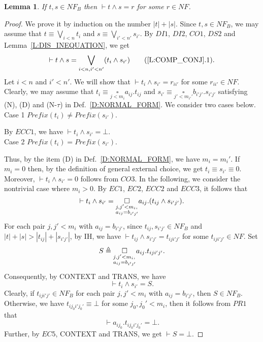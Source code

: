 \documentclass{elsarticle}
\theoremstyle{plain}
\newtheorem{lemma}[theorem]{Lemma}
\theoremstyle{definition}
\begin{document}
\begin{lemma}\label{L:COMP_CONJ}
  If $t,s\in NF_B$ then $\vdash t \wedge s = r$ for some $r \in NF$.
\end{lemma}
\begin{proof}
We prove it by induction on the number $|t|+|s|$.
  Since $t,s \in NF_B$, we may assume that $t \equiv \underset{i< n}{\bigvee}t_{i}$ and $s \equiv \underset{i'< n'}{\bigvee}s_{i'}$.
   By $DI1$, $DI2$, $CO1$, $DS2$ and Lemma~\ref{L:DIS_INEQUATION}, we get
   \[ \vdash t \wedge s
    = \bigvee_{i< n,i'< n'}(t_{i}\wedge s_{i'}) \tag{\ref{L:COMP_CONJ}.1}.\]
    Let $i< n$ and $i'< n'$. We will show that $\vdash t_{i} \wedge s_{i'}=r_{ii'}$ for some $r_{ii'} \in NF$. Clearly, we may assume that $t_{i}\equiv \underset{j< m_{i}}{\square}a_{ij}.t_{ij}$ and $s_{i'}\equiv \underset{j'< m_{i'}'}{\square}b_{i'j'}.s_{i'j'}$ satisfying (N), (D) and (N-$\tau$) in Def.~\ref{D:NORMAL_FORM}. We consider two cases below.\\


    \noindent Case 1 $Prefix(t_{i})\neq Prefix(s_{i'})$.

          By  $ECC1$, we have $\vdash t_{i} \wedge s_{i'}  = \bot $.\\

    \noindent Case 2  $Prefix(t_{i})= Prefix(s_{i'})$.

        Thus, by the item (D) in Def.~\ref{D:NORMAL_FORM}, we have $m_i = m_i'$.
        If $m_i=0$ then, by the definition of general external choice, we get $t_i\equiv s_{i'} \equiv 0$.
        Moreover, $\vdash t_i \wedge s_{i'}=0$ follows from $CO3$.
        In the following, we consider the nontrivial case where $m_i>0$.
        By $EC1$, $EC2$, $ECC2$ and $ECC3$, it follows that
        \[\vdash t_{i} \wedge s_{i'}  = \underset{\begin{subarray}
                   \; j,j'<m_i,\\
                   a_{ij}= b_{i'j'}
                \end{subarray}}\square a_{ij}.(t_{ij} \wedge s_{i'j'}). \]
         For each pair $j,j'< m_i$  with $a_{ij}= b_{i'j'}$,
         since $t_{ij},s_{i'j'} \in NF_B$ and $|t|+|s|>|t_{ij}|+|s_{i'j'}|$, by IH, we have $\vdash t_{ij} \wedge s_{i'j'} = t_{iji'j'}$ for some  $t_{iji'j'} \in NF$.
         Set \[S \triangleq \underset{\begin{subarray}
                   \; j,j'<m_i,\\
                   a_{ij}= b_{i'j'}
                \end{subarray}}\square a_{ij}.t_{iji'j'}.\]
        Consequently, by  CONTEXT and TRANS, we have
            \[\vdash t_{i} \wedge s_{i'} = S.\]
        Clearly, if $t_{iji'j'}\in NF_{B}$ for each pair $j,j'<m_i$ with  $a_{ij}= b_{i'j'}$, then $S \in NF_{B}$.
        Otherwise, we have $t_{ij_0i'j_0'} \equiv \bot$ for some $j_0,j_0'<m_i$, then it follows from $PR1$ that \[\vdash  a_{ij_0}.t_{ij_0i'j_0'}  =\bot.\]
        Further, by $EC5$, CONTEXT and TRANS, we get $\vdash S =\bot$.


\end{proof}
\end{document}
